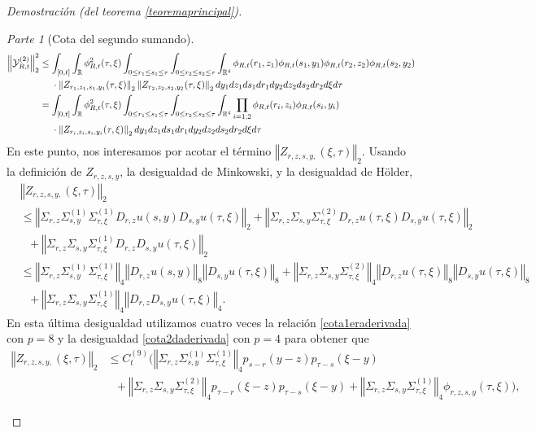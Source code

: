 \documentclass[letterpaper,twoside,12pt]{book}
\newcommand{\R}{\mathbb{R}}
\newcommand{\1}{\mathds{1}}
\newcommand{\norm}[1]{\left\Vert #1 \right\Vert}
\theoremstyle{definition}
\theoremstyle{definition}
\theoremstyle{remark}
\newtheorem{proofpart}{Parte}
\theoremstyle{definition}
\theoremstyle{definition}
\theoremstyle{definition}
\theoremstyle{definition}
\theoremstyle{definition}
\begin{document}
\begin{proof}[Demostración (del teorema \ref{teoremaprincipal})]
\begin{proofpart}[Cota del segundo sumando]
\begin{align}
   \norm{\mathcal{Y}_{R,t}^{(2)}}_2^{2}&\leq \int_{[0,t]}\int_\R\phi_{R,t}^2(\tau,\xi)\int_{0\leq r_1\leq s_1\leq \tau}\int_{0\leq r_2\leq s_2\leq \tau}\int_{\R^4}\phi_{R,t}(r_1,z_1)\phi_{R,t}(s_1,y_1)\phi_{R,t}(r_2,z_2)\phi_{R,t}(s_2,y_2)\notag\\
   &\ \ \ \ \cdot \norm{Z_{r_1,z_1,s_1,y_1}(\tau,\xi)}_2 \norm{Z_{r_2,z_2,s_2,y_2}(\tau,\xi)}_2 dy_1dz_1ds_1dr_1dy_2dz_2ds_2dr_2d\xi d\tau\notag\\
   &=\int_{[0,t]}\int_\R\phi_{R,t}^2(\tau,\xi)\int_{0\leq r_1\leq s_1\leq \tau}\int_{0\leq r_2\leq s_2\leq \tau}\int_{\R^4}\prod_{i=1,2}\phi_{R,t}(r_i,z_i)\phi_{R,t}(s_i,y_i)\notag\\
   &\ \ \ \ \cdot \norm{Z_{r_i,z_i,s_i,y_i}(\tau,\xi)}_2  dy_1dz_1ds_1dr_1dy_2dz_2ds_2dr_2d\xi d\tau \label{pruebacotazeta1}
\end{align}
En este punto, nos interesamos por acotar el término $\norm{Z_{r,z,s,y,}(\xi,\tau)}_2$. Usando la definición de $Z_{r,z,s,y}$, la desigualdad de Minkowski, y la desigualdad de Hölder, 
\begin{align*}
   &\norm{Z_{r,z,s,y,}(\xi,\tau)}_2\\
   &\leq \norm{\Sigma_{r,z}\Sigma_{s,y}^{(1)}\Sigma_{\tau,\xi}^{(1)}D_{r,z}u(s,y)D_{s,y}u(\tau,\xi)}_2+\norm{\Sigma_{r,z}\Sigma_{s,y}\Sigma_{\tau,\xi}^{(2)}D_{r,z}u(\tau,\xi)D_{s,y}u(\tau,\xi)}_2\\
   &\ \ \ +\norm{\Sigma_{r,z}\Sigma_{s,y}\Sigma_{\tau,\xi}^{(1)}D_{r,z}D_{s,y}u(\tau,\xi)}_2\\
   &\leq \norm{\Sigma_{r,z}\Sigma_{s,y}^{(1)}\Sigma_{\tau,\xi}^{(1)}}_4\norm{D_{r,z}u(s,y)}_8\norm{D_{s,y}u(\tau,\xi)}_8+\norm{\Sigma_{r,z}\Sigma_{s,y}\Sigma_{\tau,\xi}^{(2)}}_4 \norm{D_{r,z}u(\tau,\xi)}_8 \norm{D_{s,y}u(\tau,\xi)}_8\\
   &\ \ \ +\norm{\Sigma_{r,z}\Sigma_{s,y}\Sigma_{\tau,\xi}^{(1)}}_4\norm{D_{r,z}D_{s,y}u(\tau,\xi)}_4.
\end{align*}
En esta última desigualdad utilizamos cuatro veces la relación \eqref{cota1eraderivada} con $p=8$ y la desigualdad \eqref{cota2daderivada} con $p=4$ para obtener que 
\begin{align*}
   \norm{Z_{r,z,s,y,}(\xi,\tau)}_2&\leq C_{t}^{(9)} \Big(\norm{\Sigma_{r,z}\Sigma_{s,y}^{(1)}\Sigma_{\tau,\xi}^{(1)}}_4p_{s-r}(y-z)p_{\tau-s}(\xi-y)\\
   &\ \ \ +\norm{\Sigma_{r,z}\Sigma_{s,y}\Sigma_{\tau,\xi}^{(2)}}_4p_{\tau-r}(\xi-z)p_{\tau-s}(\xi-y)+\norm{\Sigma_{r,z}\Sigma_{s,y}\Sigma_{\tau,\xi}^{(1)}}_4\phi_{r,z,s,y}(\tau,\xi)\Big),

\end{align*}
\end{proofpart}
\end{proof}
\end{document}
